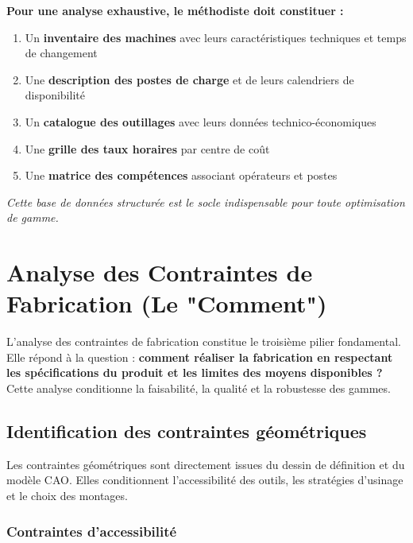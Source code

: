 \documentclass{article}
\begin{document}
\begin{tcolorbox}[colback=gray!5!white, colframe=gray!75!black, title=Synthèse : Analyse des Moyens de Production]
\begin{center}
\textbf{Pour une analyse exhaustive, le méthodiste doit constituer :}
\end{center}
\begin{enumerate}
    \item Un \textbf{inventaire des machines} avec leurs caractéristiques techniques et temps de changement
    \item Une \textbf{description des postes de charge} et de leurs calendriers de disponibilité
    \item Un \textbf{catalogue des outillages} avec leurs données technico-économiques
    \item Une \textbf{grille des taux horaires} par centre de coût
    \item Une \textbf{matrice des compétences} associant opérateurs et postes
\end{enumerate}
\textit{Cette base de données structurée est le socle indispensable pour toute optimisation de gamme.}
\end{tcolorbox}

\section{Analyse des Contraintes de Fabrication (Le "Comment")}

L'analyse des contraintes de fabrication constitue le troisième pilier fondamental. Elle répond à la question : \textbf{comment réaliser la fabrication en respectant les spécifications du produit et les limites des moyens disponibles ?} Cette analyse conditionne la faisabilité, la qualité et la robustesse des gammes.

\subsection{Identification des contraintes géométriques}

Les contraintes géométriques sont directement issues du dessin de définition et du modèle CAO. Elles conditionnent l'accessibilité des outils, les stratégies d'usinage et le choix des montages.

\subsubsection{Contraintes d'accessibilité}
\end{document}
